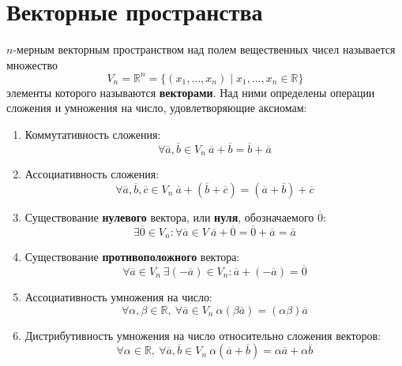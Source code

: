 \section{Векторные пространства}
 $n$\nobreakdash-мерным векторным пространством над полем вещественных чисел называется множество
\begin{equation*}
V_n = \mathbb R^n = \{ (x_1, \ldots, x_n) \mid x_1, \ldots, x_n \in \mathbb R \}
\end{equation*}
элементы которого называются \textbf{векторами}. Над ними определены операции сложения и умножения на число, удовлетворяющие аксиомам:
\begin{enumerate}
	\item Коммутативность сложения:
	\begin{equation*}
	\forall \overline a, \overline b \in V_n \
	\overline a + \overline b = \overline b + \overline a
	\end{equation*}
	
	\item Ассоциативность сложения:
	\begin{equation*}
	\forall \overline a, \overline b, \overline c \in V_n \
	\overline a + (\overline b + \overline c) = (\overline a + \overline b) + \overline c
	\end{equation*}
	
	\item Существование \textbf{нулевого} вектора, или \textbf{нуля}, обозначаемого $\overline 0$:
	\begin{equation*}
	\exists \overline 0 \in V_n \colon \forall \overline a \in V \
	\overline a + \overline 0 = \overline 0 + \overline a = \overline a
	\end{equation*}
	
	\item Существование \textbf{противоположного} вектора:
	\begin{equation*}
	\forall \overline a \in V_n \
	\exists (-\overline a) \in V_n \colon
	\overline a + (-\overline a) = \overline 0
	\end{equation*}
	
	\item Ассоциативность умножения на число:
	\begin{equation*}
	\forall \alpha, \beta \in \mathbb R, \
	\forall \overline a \in V_n \
	\alpha (\beta \overline a) = (\alpha \beta) \overline a
	\end{equation*}
	
	\item Дистрибутивность умножения на число относительно сложения векторов:
	\begin{equation*}
	\forall \alpha \in \mathbb R, \
	\forall \overline a, \overline b \in V_n \
	\alpha (\overline a + \overline b) = \alpha \overline a + \alpha \overline b
	\end{equation*}
	

\end{enumerate}
